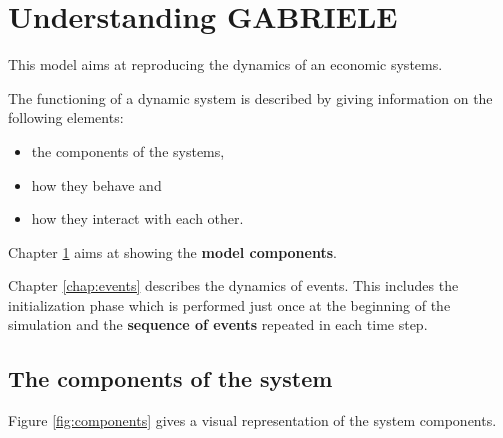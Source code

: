 \documentclass{book}
\begin{document}
\part{Understanding GABRIELE}

This model aims at reproducing the dynamics of an economic systems.

The functioning of a dynamic system is described by giving information on the following elements:
\begin{itemize}
	\item the components of the systems, 
	\item how they behave and 
	\item how they interact with each other. 
\end{itemize}


Chapter \ref{chap:components} aims at showing the \textbf{model components}.


Chapter \ref{chap:events} describes the dynamics of events. This includes the initialization phase which is performed just once at the beginning of the simulation and the \textbf{sequence of events} repeated in each time step.





\newpage

\chapter{The components of the system}\label{chap:components}

Figure \ref{fig:components} gives a visual representation of the system components.
\end{document}
